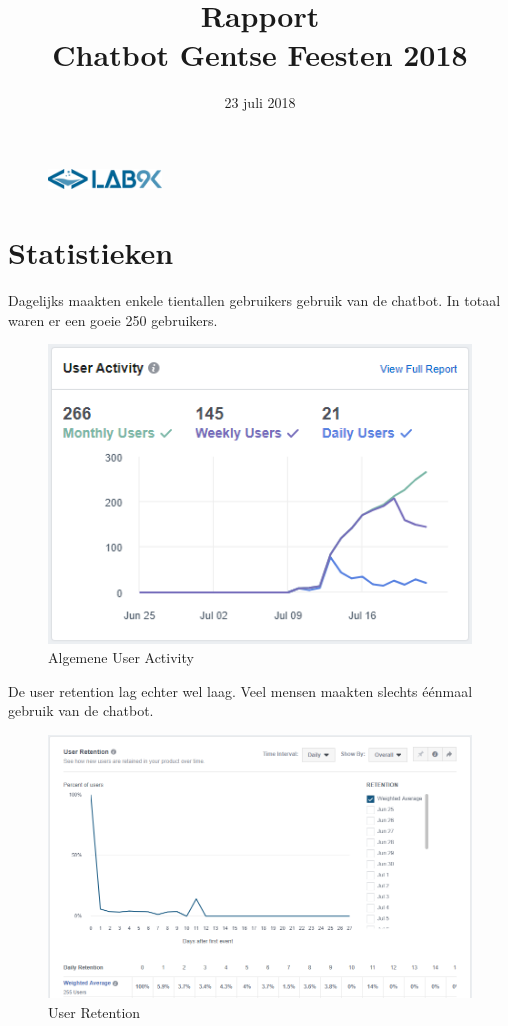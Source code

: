 \documentclass[11pt, letterpaper, oneside]{article}
\title{Rapport \\ Chatbot Gentse Feesten 2018}
\author{}
\date{23 juli 2018}
\begin{document}
	\begin{figure}
			\includegraphics[width=0.27\textwidth,keepaspectratio]{figuren/logo} %
	\end{figure}
	\vspace*{0.35cm}
	
	\noindent
	\fontsize{30pt}{28pt}\selectfont\textcolor{priColour}{\textbf{\@title}}\newline
	
	\fontsize{11pt}{15pt}\selectfont
	
	
	\section{Statistieken}
	
	Dagelijks maakten enkele tientallen gebruikers gebruik van de chatbot. In totaal waren er een goeie 250 gebruikers.

	\begin{figure}[h]
		\centering
		\includegraphics[width=0.7\linewidth]{./figuren/user-activity}
		\caption{Algemene User Activity}
		\label{user-activity}
	\end{figure}

	\newpage

	De user retention lag echter wel laag. Veel mensen maakten slechts éénmaal gebruik van de chatbot.
	
	\begin{figure}[h]
		\centering
		\includegraphics[width=0.7\linewidth]{./figuren/user-retention}
		\caption{User Retention}
		\label{user-retention}
	\end{figure}
\end{document}

